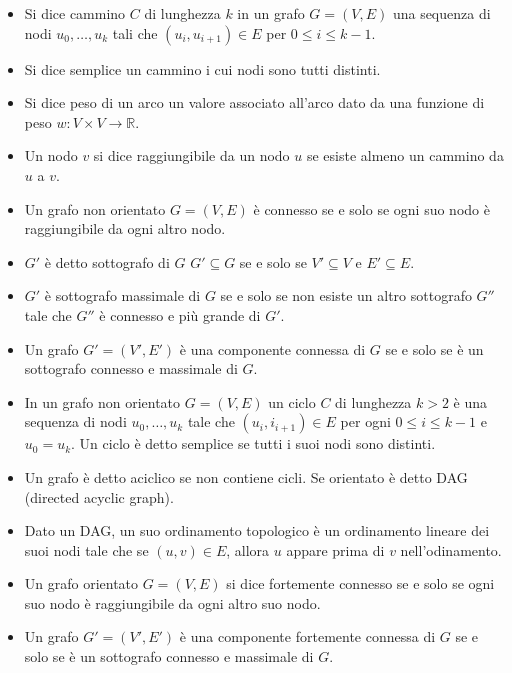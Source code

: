 \begin{itemize}
\item Si dice cammino $C$ di lunghezza $k$ in un grafo $G=(V,E)$ una sequenza di nodi $u_0, \dots, u_k$ tali che $(u_i, u_{i+1})\in E$ per $0\le i\le k-1$.
\item Si dice semplice un cammino i cui nodi sono tutti distinti.
\item Si dice peso di un arco un valore associato all'arco dato da una funzione di peso $w: V\times V\rightarrow\mathbb{R}$.
\item Un nodo $v$ si dice raggiungibile da un nodo $u$ se esiste almeno un cammino da $u$ a $v$. 
\item Un grafo non orientato $G=(V, E)$ \`e connesso se e solo se ogni suo nodo \`e raggiungibile da ogni altro nodo. 
\item $G'$ \`e detto sottografo di $G$ $G'\subseteq G$ se e solo se $V'\subseteq V$ e $E'\subseteq E$.
\item $G'$ \`e sottografo massimale di $G$ se e solo se non esiste un altro sottografo $G''$ tale che $G''$ \`e connesso e pi\`u grande di $G'$.
\item Un grafo $G'=(V', E')$ \`e una componente connessa di $G$ se e solo se \`e un sottografo connesso e massimale di $G$.
\item In un grafo non orientato $G=(V, E)$ un ciclo $C$ di lunghezza $k>2$ \`e una sequenza di nodi $u_0, \dots, u_k$ tale che $(u_i, i_{i+1})\in E$ per 
ogni $0\le i\le k-1$ e $u_0=u_k$. Un ciclo \`e detto semplice se tutti i suoi nodi sono distinti. 
\item Un grafo \`e detto aciclico se non contiene cicli. Se orientato \`e detto DAG (directed acyclic graph). 
\item Dato un DAG, un suo ordinamento topologico \`e un ordinamento lineare dei suoi nodi tale che se $(u, v)\in E$, allora $u$ appare prima di $v$ 
nell'odinamento.
\item Un grafo orientato $G=(V, E)$ si dice fortemente connesso se e solo se ogni suo nodo \`e raggiungibile da ogni altro suo nodo.
\item Un grafo $G'=(V', E')$ \`e una componente fortemente connessa di $G$ se e solo se \`e un sottografo connesso e massimale di $G$. 
\end{itemize}
